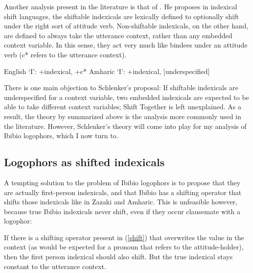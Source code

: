 \documentclass[output=paper]{langscibook}
\begin{document}
Another analysis present in the literature is that of \citet{Schlenker2003}. He proposes in indexical shift languages, the shiftable indexicals are lexically defined to optionally shift under the right sort of attitude verb. Non-shiftable indexicals, on the other hand, are defined to always take the utterance context, rather than any embedded context variable. In this sense, they act very much like bindees under an attitude verb (c\** refers to the utterance context).
\begin{exe}
	\ex \begin{xlist}
		\ex English `I': +indexical, +c\**
		\ex Amharic `I': +indexical, [underspecified]
	\end{xlist}
\end{exe}
There is one main objection to Schlenker's proposal: If shiftable indexicals are underspecified for a context variable, two embedded indexicals are expected to be able to take different context variables; Shift Together is left unexplained. As a result, the theory by \citet{Anand2006} summarized above is the analysis more commonly used in the literature. However, Schlenker's theory will come into play for my analysis of Ibibio logophors, which I now turn to.



\subsection{Logophors as shifted indexicals}

A tempting solution to the problem of Ibibio logophors is to propose that they are actually first-person indexicals, and that Ibibio has a shifting operator that shifts those indexicals like in Zazaki and Amharic. This is unfeasible however, because true Ibibio indexicals never shift, even if they occur clausemate with a logophor:
\begin{exe}
	\label{shift}
\end{exe}
If there is a shifting operator present in (\ref{shift}) that overwrites the  value in the context (as would be expected for a pronoun that refers to the attitude-holder), then the first person indexical should also shift. But the true indexical stays constant to the utterance context.
\end{document}
